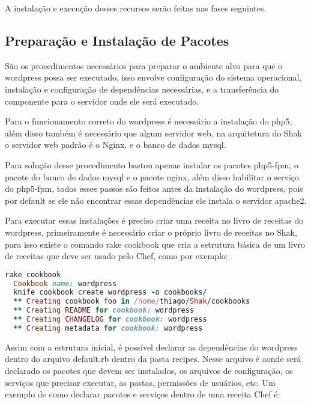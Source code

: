 A instalação e execução desses recursos serão feitas nas fases seguintes.

\subsection{Preparação e Instalação de Pacotes}
\label{wordpress:preparacao}

São os procedimentos necessários para preparar o ambiente alvo para que o wordpress
possa ser executado, isso envolve configuração do sistema operacional, instalação
e configuração de dependências necessárias, e a transferência do componente
para o servidor onde ele será executado.

Para o funcionamento correto do wordpress é necessário a instalação do php5, além
disso também é necessário que algum servidor web, na arquitetura do Shak o servidor
web padrão é o Nginx, e o banco de dados mysql.

Para solução desse procedimento bastou apenas instalar os pacotes php5-fpm, o pacote
do banco de dados mysql e o pacote nginx, além disso habilitar o serviço do
php5-fpm, todos esses passos são feitos antes da instalação do wordpress,
pois por default se ele não encontrar essas dependências ele instala o servidor
apache2.

Para executar essas instalações é preciso criar uma receita no livro de receitas
do wordpress, primeiramente é necessário criar o próprio livro de receitas no Shak,
para isso existe o comando rake cookbook que cria a estrutura básica
de um livro de receitas que deve ser usado pelo Chef, como por exemplo:

\begin{lstlisting}[language=Ruby,label=dice_index,caption={Exemplo de criação de estrutura básica de livro de receitas do wordpress com shak}]
  rake cookbook
  Cookbook name: wordpress
  knife cookbook create wordpress -o cookbooks/
  ** Creating cookbook foo in /home/thiago/Shak/cookbooks
  ** Creating README for cookbook: wordpress
  ** Creating CHANGELOG for cookbook: wordpress
  ** Creating metadata for cookbook: wordpress
\end{lstlisting}

Assim com a estrutura inicial, é possível declarar as dependências do wordpress
dentro do arquivo default.rb dentro da pasta recipes. Nesse arquivo é aonde
será declarado os pacotes que devem ser instalados, os arquivos de configuração,
os serviços que precisar executar, as pastas, permissões de usuários, etc. Um exemplo
de como declarar pacotes e serviços dentro de uma receita Chef é:

